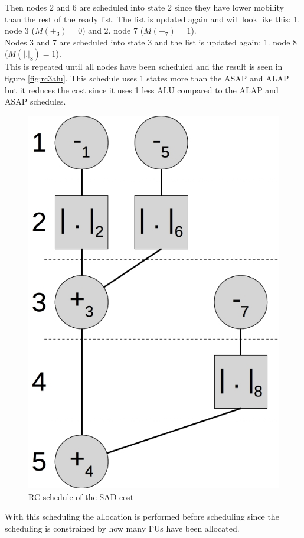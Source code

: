 Then nodes 2 and 6 are scheduled into state 2 since they have lower mobility than the rest of the ready list. The list is updated again and will look like this: 1. node 3 ($M(+_3)=0$) and 2. node 7 ($M(-_7)=1$).\\

Nodes 3 and 7 are scheduled into state 3 and the list is updated again: 1. node 8 ($M(|.|_8)=1$).\\

This is repeated until all nodes have been scheduled and the result is seen in figure \vref{fig:rc3alu}. This schedule uses 1 states more than the ASAP and ALAP but it reduces the cost since it uses 1 less ALU compared to the ALAP and ASAP schedules.\\

\begin{figure}[ht!]
  \centering
  \includegraphics[scale=0.4]{figures/rccsad.jpg}
  \caption{RC schedule of the SAD cost}
  \label{fig:rc3alu}
\end{figure}
With this scheduling the allocation is performed before scheduling since the scheduling is constrained by how many FUs have been allocated.

